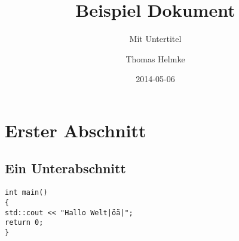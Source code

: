 \documentclass[titlepage]{scrartcl}
\title{Beispiel Dokument}
\subtitle{Mit Untertitel}
\author{Thomas Helmke}
\date{2014-05-06}
\begin{document}
\maketitle

\tableofcontents
\clearpage

\section{Erster Abschnitt}\label{sec:Kapitel1}
\subsection{Ein Unterabschnitt}
\begin{lstlisting}
int main()
{
std::cout << "Hallo Welt|öä|";
return 0;
}
\end{lstlisting}
\end{document}
